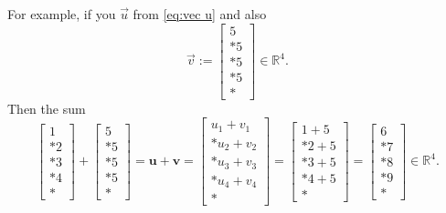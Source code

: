 \documentclass{article}
\begin{document}
For example, if you $\vec{u}$ from \eqref{eq:vec u} and also
\begin{equation}\label{eq:vec v}
    \vec{v} := \left[
        \begin{matrix}
            5 \\*
            5 \\*
            5 \\*
            5 \\*
        \end{matrix}
    \right] \in \mathbb{R}^4.
\end{equation}
Then the sum
\begin{equation}
    \left[
        \begin{matrix}
            1 \\*
            2 \\*
            3 \\*
            4 \\*
        \end{matrix}
    \right] + \left[
        \begin{matrix}
            5 \\*
            5 \\*
            5 \\*
            5 \\*
        \end{matrix}
    \right] = \mathbf{u} + \mathbf{v} = \left[
        \begin{matrix}
            u_1 + v_1 \\*
            u_2 + v_2 \\*
            u_3 + v_3 \\*
            u_4 + v_4 \\*
        \end{matrix}
    \right] = \left[
        \begin{matrix}
            1 + 5 \\*
            2 + 5 \\*
            3 + 5 \\*
            4 + 5 \\*
        \end{matrix}
    \right] = \left[
        \begin{matrix}
            6 \\*
            7 \\*
            8 \\*
            9 \\*
        \end{matrix}
    \right] \in \mathbb{R}^4.
\end{equation}
\end{document}
